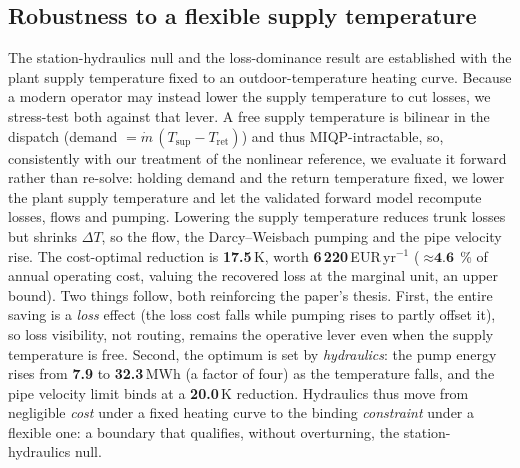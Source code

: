 \documentclass[a4paper,fleqn]{cas-sc}
\begin{document}
\subsection{Robustness to a flexible supply temperature}
\label{subsec:tsup}
The station-hydraulics null and the loss-dominance result are established with the plant
supply temperature fixed to an outdoor-temperature heating curve. Because a modern operator
may instead lower the supply temperature to cut losses, we stress-test both against that
lever. A free supply temperature is bilinear in the dispatch (demand $=\dot m\,(T_\text{sup}
-T_\text{ret})$) and thus MIQP-intractable, so, consistently with our treatment of the
nonlinear reference, we evaluate it forward rather than re-solve: holding demand and the
return temperature fixed, we lower the plant supply temperature and let the validated forward
model recompute losses, flows and pumping. Lowering the supply temperature reduces trunk
losses but shrinks $\Delta T$, so the flow, the Darcy--Weisbach pumping and the pipe velocity
rise. The cost-optimal reduction is \textbf{17.5}\,K, worth
\textbf{6\,220}\,EUR\,yr$^{-1}$ ($\approx\textbf{4.6}$\,\% of annual
operating cost, valuing the recovered loss at the marginal unit, an upper bound). Two things
follow, both reinforcing the paper's thesis. First, the entire saving is a \emph{loss} effect
(the loss cost falls while pumping rises to partly offset it), so loss visibility, not
routing, remains the operative lever even when the supply temperature is free. Second, the
optimum is set by \emph{hydraulics}: the pump energy rises from \textbf{7.9} to
\textbf{32.3}\,MWh (a factor of four) as the temperature falls, and the pipe
velocity limit binds at a \textbf{20.0}\,K reduction. Hydraulics thus move
from negligible \emph{cost} under a fixed heating curve to the binding \emph{constraint} under
a flexible one: a boundary that qualifies, without overturning, the station-hydraulics null.

\end{document}
